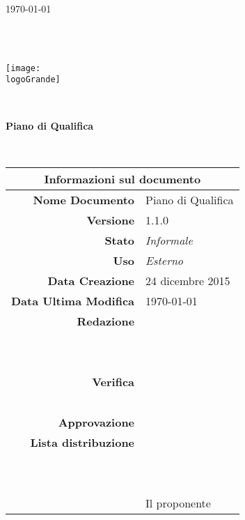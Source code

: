 \documentclass[12pt,a4paper]{article}
\title{\titoloDocumento}
\newcommand{\titoloDocumento}{Piano di Qualifica}
\newcommand{\dataCreazione}{24 dicembre 2015}
\newcommand{\versione}{1.1.0}
\newcommand{\stato}{Informale}
\newcommand{\uso}{Esterno}
\begin{document}
\begin{titlepage}
\begin{center}
\today \\
\vspace{1cm}
\begin{Huge}
\textbf{\nomeGruppo} \\
\end{Huge}
\textbf{\prjL{}} \\
\vspace{1cm}
\texttt{[image: \\logoGrande]}
\vspace{1cm}

\HRule \\[0.4cm]
\begin{Huge}
{\huge \bfseries \titoloDocumento}\\[0.4cm]
\end{Huge}
\HRule \\[1cm]
\vfill

\begin{table}[h]
\begin{center}
\begin{tabular}{r | l}
\multicolumn{2}{c}{\textbf{Informazioni sul documento}}\\
\midrule
\textbf{Nome Documento}	&	\titoloDocumento	\\
\textbf{Versione}	&	\versione	\\
\textbf{Stato}	&	\emph{\stato}	\\
\textbf{Uso}	&	\emph{\uso}	\\
\textbf{Data Creazione}	&	\dataCreazione	\\
\textbf{Data Ultima Modifica}	&	\today	\\
\textbf{Redazione}	& \AB{} \\
\ 	& \AVI{} \\
\ 	& \IB{} \\
\textbf{Verifica}	&	\AVE{}	\\
\ 	& \NDC{} \\
\textbf{Approvazione}	& \IB{} \\
\textbf{Lista distribuzione}	&	\nomeGruppo{}	\\
\ 	&	\Vardanega{}	\\
\ 	&	\Cardin{}	\\
\ 	&	Il proponente \Zucchetti{}	\\

\end{tabular}
\end{center}
\end{table}

\end{center}
\end{titlepage}
\newpage
\end{document}
